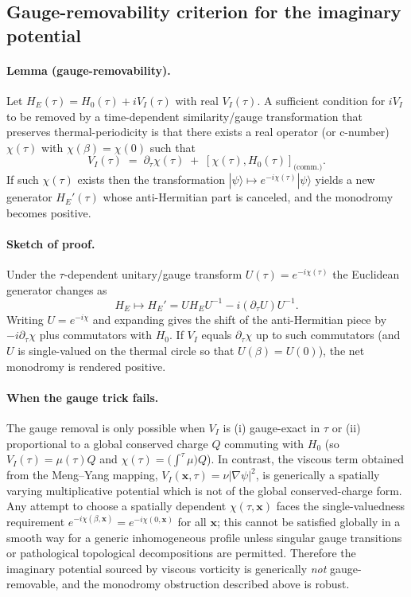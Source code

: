 \documentclass[11pt]{article}
\begin{document}
\subsection*{Gauge-removability criterion for the imaginary potential}

\paragraph{Lemma (gauge-removability).}
Let \(H_E(\tau)=H_0(\tau)+iV_I(\tau)\) with real \(V_I(\tau)\). A sufficient condition for \(iV_I\) to be removed by a time-dependent similarity/gauge transformation that preserves thermal-periodicity is that there exists a real operator (or c-number) \(\chi(\tau)\) with \(\chi(\beta)=\chi(0)\) such that
\[
V_I(\tau) \;=\; \partial_\tau\chi(\tau) \;+\; [\chi(\tau),H_0(\tau)]_{\text{(comm.)}}.
\]
If such \(\chi(\tau)\) exists then the transformation \(|\psi\rangle\mapsto e^{-i\chi(\tau)}|\psi\rangle\) yields a new generator \(H_E'(\tau)\) whose anti-Hermitian part is canceled, and the monodromy becomes positive.

\paragraph{Sketch of proof.}
Under the \(\tau\)-dependent unitary/gauge transform \(U(\tau)=e^{-i\chi(\tau)}\) the Euclidean generator changes as
\[
H_E \mapsto H_E' = U H_E U^{-1} - i(\partial_\tau U)U^{-1} .
\]
Writing \(U=e^{-i\chi}\) and expanding gives the shift of the anti-Hermitian piece by \(-i\partial_\tau\chi\) plus commutators with \(H_0\). If \(V_I\) equals \(\partial_\tau\chi\) up to such commutators (and \(U\) is single-valued on the thermal circle so that \(U(\beta)=U(0)\)), the net monodromy is rendered positive.

\paragraph{When the gauge trick fails.}
The gauge removal is only possible when \(V_I\) is (i) gauge-exact in \(\tau\) or (ii) proportional to a global conserved charge \(Q\) commuting with \(H_0\) (so \(V_I(\tau)=\mu(\tau)Q\) and \(\chi(\tau)=\big(\int^\tau \mu\big)Q\)). In contrast, the viscous term obtained from the Meng--Yang mapping, \(V_I(\mathbf x,\tau)=\nu|\nabla\psi|^2\), is generically a spatially varying multiplicative potential which is not of the global conserved-charge form. Any attempt to choose a spatially dependent \(\chi(\tau,\mathbf x)\) faces the single-valuedness requirement \(e^{-i\chi(\beta,\mathbf x)}=e^{-i\chi(0,\mathbf x)}\) for all \(\mathbf x\); this cannot be satisfied globally in a smooth way for a generic inhomogeneous profile unless singular gauge transitions or pathological topological decompositions are permitted. Therefore the imaginary potential sourced by viscous vorticity is generically \emph{not} gauge-removable, and the monodromy obstruction described above is robust.
\end{document}
